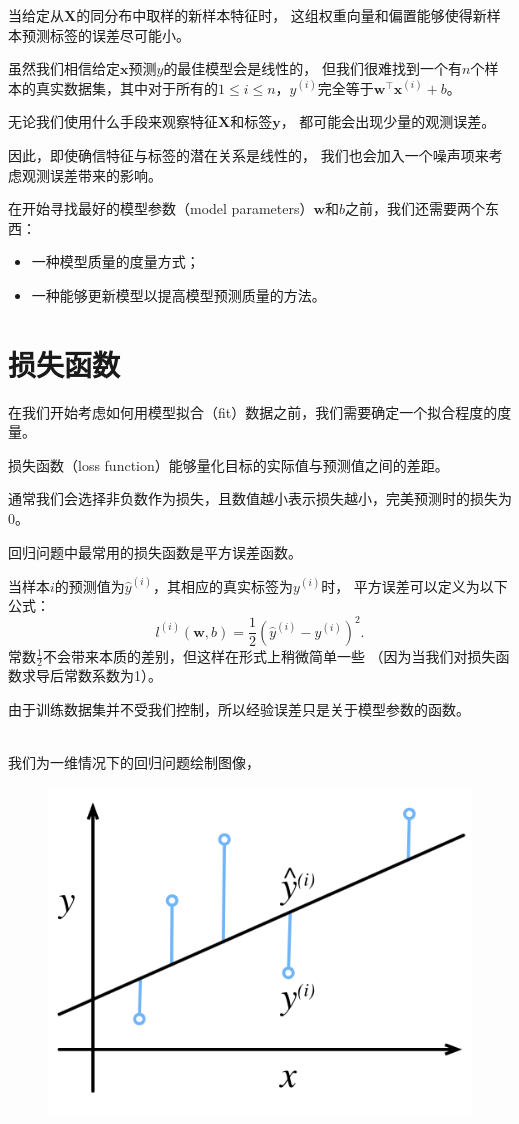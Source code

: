 \documentclass[openany,11pt]{book}
\begin{document}
当给定从$\mathbf{X}$的同分布中取样的新样本特征时，
这组权重向量和偏置能够使得新样本预测标签的误差尽可能小。

虽然我们相信给定$\mathbf{x}$预测$y$的最佳模型会是线性的，
但我们很难找到一个有$n$个样本的真实数据集，其中对于所有的$1 \leq i \leq n$，$y^{(i)}$完全等于$\mathbf{w}^\top \mathbf{x}^{(i)}+b$。

无论我们使用什么手段来观察特征$\mathbf{X}$和标签$\mathbf{y}$，
都可能会出现少量的观测误差。

因此，即使确信特征与标签的潜在关系是线性的，
我们也会加入一个噪声项来考虑观测误差带来的影响。

在开始寻找最好的模型参数（model parameters）$\mathbf{w}$和$b$之前，我们还需要两个东西：
\begin{itemize}
	\item 一种模型质量的度量方式；
	
	\item 一种能够更新模型以提高模型预测质量的方法。
\end{itemize}

\chapter{损失函数}

在我们开始考虑如何用模型拟合（fit）数据之前，我们需要确定一个拟合程度的度量。

损失函数（loss function）能够量化目标的实际值与预测值之间的差距。

通常我们会选择非负数作为损失，且数值越小表示损失越小，完美预测时的损失为0。

回归问题中最常用的损失函数是平方误差函数。

当样本$i$的预测值为$\hat{y}^{(i)}$，其相应的真实标签为$y^{(i)}$时，
平方误差可以定义为以下公式：
$$l^{(i)}(\mathbf{w}, b) = \frac{1}{2} \left(\hat{y}^{(i)} - y^{(i)}\right)^2.$$
常数$\frac{1}{2}$不会带来本质的差别，但这样在形式上稍微简单一些
（因为当我们对损失函数求导后常数系数为1）。

由于训练数据集并不受我们控制，所以经验误差只是关于模型参数的函数。

~\\
{\color{red} 我们为一维情况下的回归问题绘制图像，}

\begin{figure}
	\centering
	\includegraphics[width=0.5\linewidth]{image.png}
	\label{fig:placeholder}
\end{figure}
\end{document}
